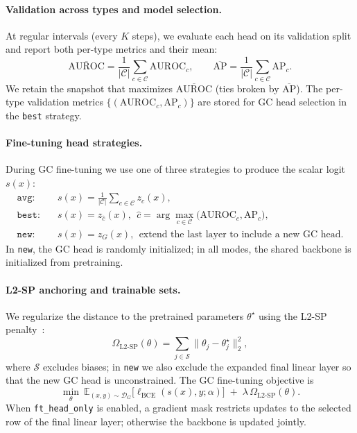 \documentclass[journal,article,submit,pdftex,moreauthors]{Definitions/mdpi}
\begin{document}
\paragraph{Validation across types and model selection.}
At regular intervals (every $K$ steps), we evaluate each head on its validation split and report both per-type metrics and their mean:
\begin{equation}
\overline{\mathrm{AUROC}}=\frac{1}{|\mathcal{C}|}\sum_{c\in\mathcal{C}}\mathrm{AUROC}_c,\qquad
\overline{\mathrm{AP}}=\frac{1}{|\mathcal{C}|}\sum_{c\in\mathcal{C}}\mathrm{AP}_c.
\end{equation}
We retain the snapshot that maximizes $\overline{\mathrm{AUROC}}$ (ties broken by $\overline{\mathrm{AP}}$). The per-type validation metrics $\{(\mathrm{AUROC}_c,\mathrm{AP}_c)\}$ are stored for GC head selection in the \texttt{best} strategy.

\paragraph{Fine-tuning head strategies.}
During GC fine-tuning we use one of three strategies to produce the scalar logit $s(x)$:
\begin{align}
\texttt{avg:}\quad & s(x)=\frac{1}{|\mathcal{C}|}\sum_{c\in\mathcal{C}} z_c(x),\\
\texttt{best:}\quad & s(x)=z_{\hat c}(x),\ \ \hat c=\arg\max_{c\in\mathcal{C}}\big(\mathrm{AUROC}_c,\mathrm{AP}_c\big),\\
\texttt{new:}\quad & s(x)=z_G(x),\ \ \text{extend the last layer to include a new GC head.}
\end{align}
In \texttt{new}, the GC head is randomly initialized; in all modes, the shared backbone is initialized from pretraining.

\paragraph{L2-SP anchoring and trainable sets.}
We regularize the distance to the pretrained parameters $\theta^\star$ using the L2-SP penalty~\citep{Li2018_L2SP}:
\begin{equation}
\Omega_{\mathrm{L2\text{-}SP}}(\theta)=\sum_{j\in\mathcal{S}}\|\theta_j-\theta^\star_j\|_2^2,
\end{equation}
where $\mathcal{S}$ excludes biases; in \texttt{new} we also exclude the expanded final linear layer so that the new GC head is unconstrained. The GC fine-tuning objective is
\begin{equation}
\label{eq:ft_obj}
\min_{\theta}\ \mathbb{E}_{(x,y)\sim \mathcal{D}_G}\!\big[\ell_{\mathrm{BCE}}(s(x),y;\alpha)\big]\;+\;\lambda\,\Omega_{\mathrm{L2\text{-}SP}}(\theta).
\end{equation}
When \texttt{ft\_head\_only} is enabled, a gradient mask restricts updates to the selected row of the final linear layer; otherwise the backbone is updated jointly.
\end{document}
